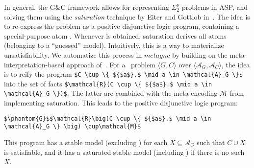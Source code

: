 %
In general, the G{\&}C framework \cite{eitpol06a} 
allows for representing $\Sigma^p_2$ problems in ASP, 
and solving them using the \textit{saturation} technique by Eiter and Gottlob in~\cite{eitgot95a}.
%
The idea is to re-express the problem as a positive disjunctive logic program, containing a special-purpose atom .
%
Whenever  is obtained, saturation derives all atoms (belonging to a ``guessed'' model).
%
Intuitively, this is a way to materialize unsatisfiability.
%
We automatize this process in $\mathit{metagnc}$ by building on the meta-interpretation-based approach of~\cite{gekasc11b}.
%
For a \gc\ problem $\langle G, C \rangle$ over $\langle \mathcal{A}_G,\mathcal{A}_C\rangle$,
the idea is to reify the program
\lstinline[mathescape=true]!$C \cup \{ ${$a$}.$ \mid a \in \mathcal{A}_G \}$!
into the set of facts
\lstinline[mathescape=true]!$\mathcal{R}(C \cup \{ ${$a$}.$ \mid a \in \mathcal{A}_G \})$!.
%
The latter are combined with the meta-encoding $\mathcal{M}$ from~\cite{gekasc11b} implementing saturation.
%    
This leads to the positive disjunctive logic program:
\begin{lstlisting}[mathescape=true]
$\phantom{G}$$\mathcal{R}\big(C \cup \{ ${$a$}.$ \mid a \in \mathcal{A}_G \} \big) \cup\mathcal{M}$
\end{lstlisting}
This program has a stable model (excluding ) for each $X \subseteq \mathcal{A}_G$ such that $C \cup X$ is satisfiable, 
and it has a saturated stable model (including ) if there is no such $X$.
%
%
